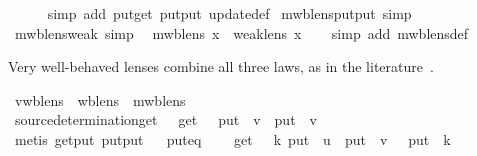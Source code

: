 \begin{isabellebody}
%
\isadelimproof
\ \ \ \ %
\endisadelimproof
%
\isatagproof
{}\isamarkupfalse%
\ {\isacharparenleft}simp\ add{\isacharcolon}\ put{\isacharunderscore}get\ put{\isacharunderscore}put\ update{\isacharunderscore}def{\isacharparenright}%
\endisatagproof
{\isafoldproof}%
%
\isadelimproof
\isanewline
%
\endisadelimproof
\isanewline
{}\isamarkupfalse%
\isanewline
\isanewline
{}\isamarkupfalse%
\ mwb{\isacharunderscore}lens{\isachardot}put{\isacharunderscore}put\ {\isacharbrackleft}simp{\isacharbrackright}\isanewline
\isanewline
{}\isamarkupfalse%
\ mwb{\isacharunderscore}lens{\isacharunderscore}weak\ {\isacharbrackleft}simp{\isacharbrackright}{\isacharcolon}\isanewline
\ \ {\isachardoublequoteopen}mwb{\isacharunderscore}lens\ x\ {\isasymLongrightarrow}\ weak{\isacharunderscore}lens\ x{\isachardoublequoteclose}\isanewline
%
\isadelimproof
\ \ %
\endisadelimproof
%
\isatagproof
{}\isamarkupfalse%
\ {\isacharparenleft}simp\ add{\isacharcolon}\ mwb{\isacharunderscore}lens{\isacharunderscore}def{\isacharparenright}%
\endisatagproof
{\isafoldproof}%
%
\isadelimproof
%
\endisadelimproof
%
\isamarkuptrue%
%
\begin{isamarkuptext}%
Very well-behaved lenses combine all three laws, as in the literature~\cite{Foster09,Fischer2015}.%
\end{isamarkuptext}\isamarkuptrue%
\isamarkupfalse%
\ vwb{\isacharunderscore}lens\ {\isacharequal}\ wb{\isacharunderscore}lens\ {\isacharplus}\ mwb{\isacharunderscore}lens\isanewline
{}\isanewline
\isanewline
\ \ \isamarkupfalse%
\ source{\isacharunderscore}determination{\isacharcolon}{\isachardoublequoteopen}get\ {\isasymsigma}\ {\isacharequal}\ get\ {\isasymrho}\ {\isasymLongrightarrow}\ put\ {\isasymsigma}\ v\ {\isacharequal}\ put\ {\isasymrho}\ v\ {\isasymLongrightarrow}\ {\isasymsigma}\ {\isacharequal}\ {\isasymrho}{\isachardoublequoteclose}\isanewline
%
\isadelimproof
\ \ \ \ %
\endisadelimproof
%
\isatagproof
{}\isamarkupfalse%
\ {\isacharparenleft}metis\ get{\isacharunderscore}put\ put{\isacharunderscore}put{\isacharparenright}%
\endisatagproof
{\isafoldproof}%
%
\isadelimproof
\isanewline
%
\endisadelimproof
\isanewline
\ \isamarkupfalse%
\ put{\isacharunderscore}eq{\isacharcolon}\isanewline
\ \ \ {\isachardoublequoteopen}{\isasymlbrakk}\ get\ {\isasymsigma}\ {\isacharequal}\ k{\isacharsemicolon}\ put\ {\isasymsigma}\ u\ {\isacharequal}\ put\ {\isasymrho}\ v\ {\isasymrbrakk}\ {\isasymLongrightarrow}\ put\ {\isasymrho}\ k\ {\isacharequal}\ {\isasymsigma}{\isachardoublequoteclose}\isanewline

\end{isabellebody}
